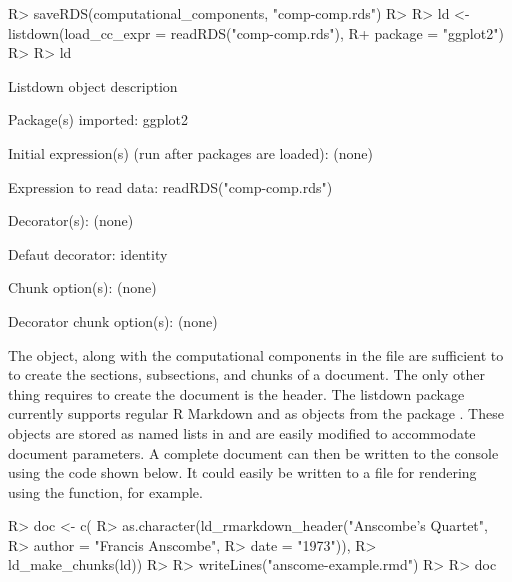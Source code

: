 \documentclass[
]{jss}
\begin{document}
\begin{CodeChunk}

\begin{CodeInput}
R> saveRDS(computational_components, "comp-comp.rds")
R> 
R> ld <- listdown(load_cc_expr = readRDS("comp-comp.rds"),
R+                package = "ggplot2")
R> 
R> ld
\end{CodeInput}

\begin{CodeOutput}

Listdown object description

Package(s) imported:
    ggplot2

Initial expression(s) (run after packages are loaded):
    (none)

Expression to read data:
    readRDS("comp-comp.rds")

Decorator(s):
    (none)

Defaut decorator:
    identity

Chunk option(s):
    (none)

Decorator chunk option(s):
    (none)
\end{CodeOutput}
\end{CodeChunk}

The  object, along with the computational components in the
 file are sufficient to to create the sections,
subsections, and  chunks of a document. The only other thing
requires to create the document is the header. The listdown package
currently supports regular R Markdown and  as 
objects from the  package \citep{yaml}. These objects are
stored as named lists in  and are easily modified to
accommodate document parameters. A complete document can then be written
to the console using the code shown below. It could easily be written to
a file for rendering using the  function, for
example.

\begin{CodeChunk}

\begin{CodeInput}
R> doc <- c(
R>   as.character(ld_rmarkdown_header("Anscombe's Quartet",
R>                                    author = "Francis Anscombe",
R>                                    date = "1973")),
R>   ld_make_chunks(ld))
R> 
R> writeLines("anscome-example.rmd")
R> 
R> doc
\end{CodeInput}
\end{CodeChunk}
\end{document}
